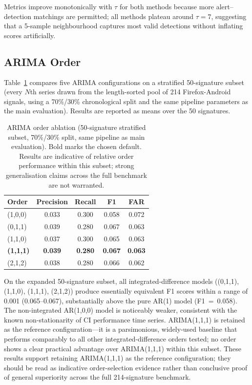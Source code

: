\documentclass[a4paper,fleqn]{cas-sc}
\theoremstyle{plain}
\begin{document}
Metrics improve monotonically with $\tau$ for both methods because more
alert--detection matchings are permitted; all methods plateau around $\tau = 7$,
suggesting that a 5-sample neighbourhood captures most valid detections without
inflating scores artificially.

\subsection{ARIMA Order}\label{sec:ablation:order}

Table~\ref{tab:ablation_order} compares five ARIMA configurations on a
stratified 50-signature subset (every $N$th series drawn from the
length-sorted pool of 214 Firefox-Android signals, using a 70\%/30\%
chronological split and the same pipeline parameters as the main evaluation).
Results are reported as means over the 50 signatures.

\begin{table}[tbp]
\centering
\begin{tabular}{lcccc}
\toprule
Order & Precision & Recall & F1 & FAR \\
\midrule
(1,0,0) & 0.033 & 0.300 & 0.058 & 0.072 \\
(0,1,1) & 0.039 & 0.280 & 0.067 & 0.063 \\
(1,1,0) & 0.037 & 0.300 & 0.065 & 0.063 \\
\textbf{(1,1,1)} & \textbf{0.039} & \textbf{0.280} & \textbf{0.067} & \textbf{0.063} \\
(2,1,2) & 0.038 & 0.280 & 0.066 & 0.062 \\
\bottomrule
\end{tabular}
\caption{ARIMA order ablation (50-signature stratified subset,
  70\%/30\% split, same pipeline as main evaluation).
  Bold marks the chosen default.
  Results are indicative of relative order performance within this subset;
  strong generalisation claims across the full benchmark are not warranted.}
\label{tab:ablation_order}
\end{table}

On the expanded 50-signature subset, all integrated-difference models
((0,1,1), (1,1,0), (1,1,1), (2,1,2)) produce essentially equivalent
F1 scores within a range of 0.001 (0.065--0.067),
substantially above the pure AR(1) model (F1~=~0.058).
The non-integrated AR(1,0,0) model is noticeably weaker, consistent with
the known non-stationarity of CI performance time series.
ARIMA(1,1,1) is retained as the reference configuration---it is a
parsimonious, widely-used baseline that performs comparably to all other
integrated-difference orders tested; no order shows a clear practical
advantage over ARIMA(1,1,1) within this subset.
These results support retaining ARIMA(1,1,1) as the reference configuration;
they should be read as indicative order-selection evidence rather than
conclusive proof of general superiority across the full 214-signature benchmark.
\end{document}
